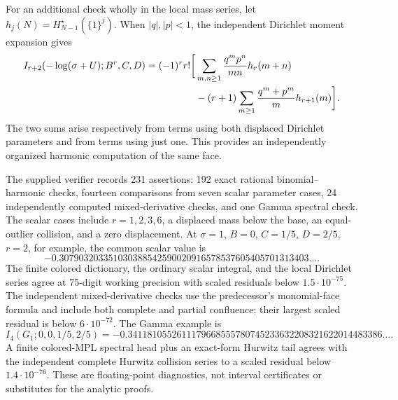 For an additional check wholly in the local mass series, let
$h_j(N)=H_{N-1}^{\star}(\{1\}^j)$. When $|q|,|p|<1$,
the independent Dirichlet moment expansion gives
\begin{align}\label{tri:eq:collision-check}
 I_{r+2}(-\log(\sigma+U);B^r,C,D)
 =(-1)^r r!\bigg[&\sum_{m,n\ge1}\frac{q^mp^n}{mn}h_r(m+n)\notag\\
 &-(r+1)\sum_{m\ge1}\frac{q^m+p^m}{m}h_{r+1}(m)\bigg].
\end{align}
The two sums arise respectively from terms using both displaced
Dirichlet parameters and from terms using just one. This provides
an independently organized harmonic computation of the same face.

The supplied verifier records 231 assertions: 192 exact rational
binomial--harmonic checks, fourteen comparisons from seven scalar
parameter cases, 24 independently computed mixed-derivative checks,
and one Gamma spectral check. The scalar cases include
$r=1,2,3,6$, a displaced mass below the base, an equal-outlier
collision, and a zero displacement. At $\sigma=1$, $B=0$,
$C=1/5$, $D=2/5$, $r=2$, for example, the common scalar value is
\[
 -0.307903203351030388542590020916578537605405701313403\ldots.
\]
The finite colored dictionary, the ordinary scalar integral, and
the local Dirichlet series agree at 75-digit working precision
with scaled residuals below $1.5\cdot10^{-75}$. The independent
mixed-derivative checks use the predecessor's monomial-face
formula and include both complete and partial confluence; their
largest scaled residual is below $6\cdot10^{-72}$.
The Gamma example is
\begin{equation}\label{tri:eq:Gamma-value}
 I_4(G_1;0,0,1/5,2/5)
  =-0.3411810552611179668555780745233632208321622014483386\ldots.
\end{equation}
A finite colored-MPL spectral head plus an exact-form Hurwitz
tail agrees with the independent complete Hurwitz collision
series to a scaled residual below $1.4\cdot10^{-76}$.
These are floating-point diagnostics, not interval certificates
or substitutes for the analytic proofs.

